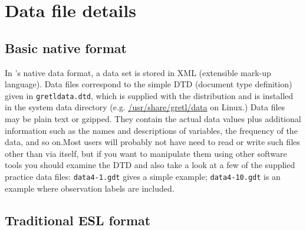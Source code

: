 \chapter{Data file details}
\label{app-datafile}

\section{Basic native format}
\label{native}

In 's native data format, a data set is stored in XML
(extensible mark-up language). Data files correspond to the simple DTD
(document type definition) given in \verb+gretldata.dtd+, which is
supplied with the  distribution and is installed in the
system data directory (e.g. \url{/usr/share/gretl/data} on Linux.)
Data files may be plain text or gzipped.  They contain the actual data
values plus additional information such as the names and descriptions
of variables, the frequency of the data, and so on.Most users will
probably not have need to read or write such files other than via
 itself, but if you want to manipulate them using other
software tools you should examine the DTD and also take a look at a
few of the supplied practice data files: \verb+data4-1.gdt+ gives a
simple example; \verb+data4-10.gdt+ is an example where observation
labels are included.

\section{Traditional ESL format}
\label{traddata}

